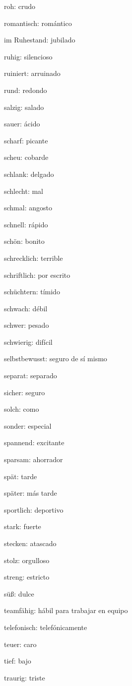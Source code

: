 \begin{multicols}{2}
\begin{myitemize}
\item roh: crudo
\item romantisch: romántico
\item im Ruhestand: jubilado
\item ruhig: silencioso
\item ruiniert: arruinado
\item rund: redondo
\item salzig: salado
\item sauer: ácido
\item scharf: picante
\item scheu: cobarde
\item schlank: delgado
\item schlecht: mal
\item schmal: angosto
\item schnell: rápido
\item schön: bonito
\item schrecklich: terrible
\item schriftlich: por escrito
\item schüchtern: tímido
\item schwach: débil
\item schwer: pesado
\item schwierig: difícil
\item selbstbewusst: seguro de sí mismo
\item separat: separado
\item sicher: seguro
\item solch: como
\item sonder: especial
\item spannend: excitante
\item sparsam: ahorrador
\item spät: tarde
\item später: más tarde
\item sportlich: deportivo
\item stark: fuerte
\item stecken: atascado
\item stolz: orgulloso
\item streng: estricto
\item süß: dulce
\item teamfähig: hábil para trabajar en equipo
\item telefonisch: telefónicamente
\item teuer: caro
\item tief: bajo
\item traurig: triste

\end{myitemize}
\end{multicols}
